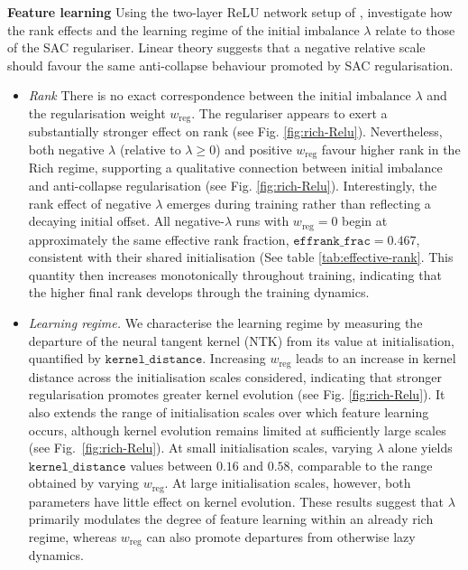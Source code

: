 \documentclass{article} %
\theoremstyle{remark}
\begin{document}
\textbf{Feature learning}
Using the two-layer ReLU network setup of \cite{kunin_2021_neural}, investigate how the rank effects  and the learning regime of the initial imbalance $\lambda$ relate to those of the SAC regulariser. Linear theory suggests that a negative relative scale should favour the same anti-collapse behaviour promoted by SAC regularisation.

\begin{itemize}
  
\item \textit{Rank} There is no exact correspondence between the initial imbalance $\lambda$ and the regularisation weight $w_{\mathrm{reg}}$. The regulariser appears to exert a substantially stronger effect on rank (see Fig. \ref{fig:rich-Relu}). Nevertheless, both negative $\lambda$ (relative to $\lambda\geq 0$) and positive $w_{\mathrm{reg}}$ favour higher rank in the Rich regime, supporting a qualitative connection between initial imbalance and anti-collapse regularisation (see Fig. \ref{fig:rich-Relu}). Interestingly, the rank effect of negative $\lambda$ emerges during training rather than reflecting a decaying initial offset. All negative-$\lambda$ runs with $w_{\mathrm{reg}}=0$ begin at approximately the same effective rank fraction, $\mathtt{effrank\_frac}=0.467$, consistent with their shared initialisation (See table \ref{tab:effective-rank}. This quantity then increases monotonically throughout training, indicating that the higher final rank develops through the training dynamics. 
\item \textit{Learning regime.} We characterise the learning regime by measuring the departure of the neural tangent kernel (NTK) from its value at initialisation, quantified by $\mathtt{kernel\_distance}$. Increasing $w_{\mathrm{reg}}$ leads to an increase in kernel distance across the initialisation scales considered, indicating that stronger regularisation promotes greater kernel evolution (see Fig. \ref{fig:rich-Relu}). It also extends the range of initialisation scales over which feature learning occurs, although kernel evolution remains limited at sufficiently large scales (see Fig.~\ref{fig:rich-Relu}). At small initialisation scales, varying $\lambda$ alone yields $\mathtt{kernel\_distance}$ values between $0.16$ and $0.58$, comparable to the range obtained by varying $w_{\mathrm{reg}}$. At large initialisation scales, however, both parameters have little effect on kernel evolution. These results suggest that $\lambda$ primarily modulates the degree of feature learning within an already rich regime, whereas $w_{\mathrm{reg}}$ can also promote departures from otherwise lazy dynamics.
\end{itemize}
\end{document}

